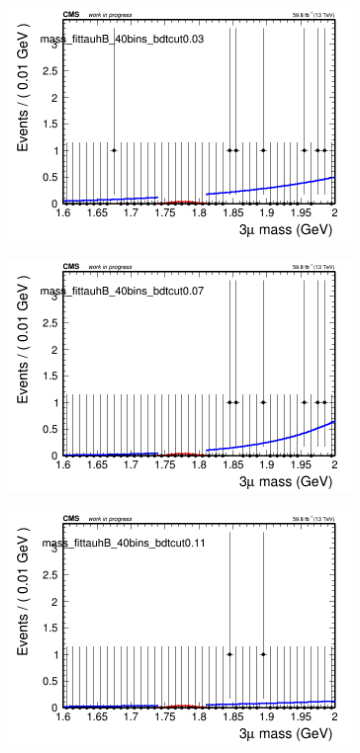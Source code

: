 \begin{figure}[H]
\begin{subfigure}{0.2\textwidth}
        \includegraphics[width=\textwidth]{power_law/plots/tauhB/massfit_tauhB_40bins_bdtcut0.03.png}
        \caption{}
    \end{subfigure}
    \begin{subfigure}{0.2\textwidth}
        \includegraphics[width=\textwidth]{power_law/plots/tauhB/massfit_tauhB_40bins_bdtcut0.07.png}
        \caption{}
    \end{subfigure}
    \begin{subfigure}{0.2\textwidth}
        \includegraphics[width=\textwidth]{power_law/plots/tauhB/massfit_tauhB_40bins_bdtcut0.11.png}

\end{subfigure}
\end{figure}
